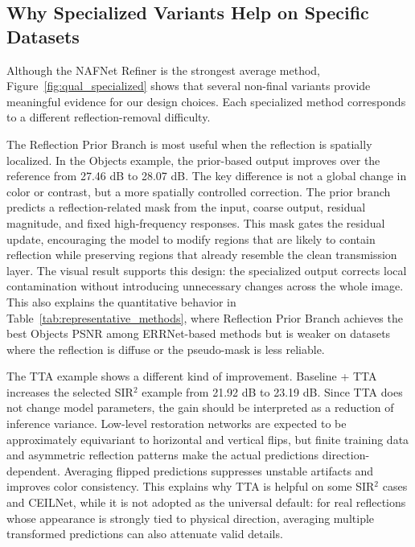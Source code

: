 \subsection{Why Specialized Variants Help on Specific Datasets}

Although the NAFNet Refiner is the strongest average method, Figure~\ref{fig:qual_specialized} shows that several non-final variants provide meaningful evidence for our design choices. Each specialized method corresponds to a different reflection-removal difficulty.

The Reflection Prior Branch is most useful when the reflection is spatially localized. In the Objects example, the prior-based output improves over the reference from 27.46 dB to 28.07 dB. The key difference is not a global change in color or contrast, but a more spatially controlled correction. The prior branch predicts a reflection-related mask from the input, coarse output, residual magnitude, and fixed high-frequency responses. This mask gates the residual update, encouraging the model to modify regions that are likely to contain reflection while preserving regions that already resemble the clean transmission layer. The visual result supports this design: the specialized output corrects local contamination without introducing unnecessary changes across the whole image. This also explains the quantitative behavior in Table~\ref{tab:representative_methods}, where Reflection Prior Branch achieves the best Objects PSNR among ERRNet-based methods but is weaker on datasets where the reflection is diffuse or the pseudo-mask is less reliable.

The TTA example shows a different kind of improvement. Baseline + TTA increases the selected SIR$^2$ example from 21.92 dB to 23.19 dB. Since TTA does not change model parameters, the gain should be interpreted as a reduction of inference variance. Low-level restoration networks are expected to be approximately equivariant to horizontal and vertical flips, but finite training data and asymmetric reflection patterns make the actual predictions direction-dependent. Averaging flipped predictions suppresses unstable artifacts and improves color consistency. This explains why TTA is helpful on some SIR$^2$ cases and CEILNet, while it is not adopted as the universal default: for real reflections whose appearance is strongly tied to physical direction, averaging multiple transformed predictions can also attenuate valid details.

